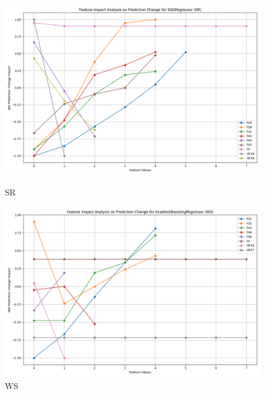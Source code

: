 \begin{figure}[H]
    \centering
    \begin{minipage}{0.495\textwidth}
        \centering
        \includegraphics[width=\linewidth]{analysis/images_reg/feature_impact_prediction_change_SR_SGDRegressor.png}
        \caption{SR}
        \label{fig:sr_class_analysis_reg}
    \end{minipage}\hfill
    \begin{minipage}{0.495\textwidth}
        \centering
        \includegraphics[width=\linewidth]{analysis/images_reg/feature_impact_prediction_change_WS_GradientBoostingRegressor.png}
        \caption{WS}
        \label{fig:ws_class_analysis_reg}
    \end{minipage}
\end{figure}

